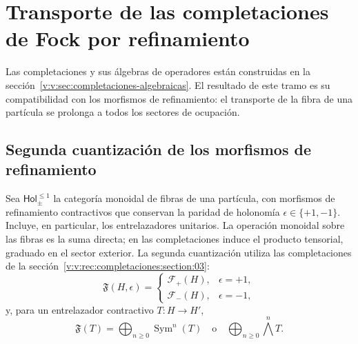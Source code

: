 \section{Transporte de las completaciones de Fock por refinamiento}
\label{v:v:rec:fock_gibbs:section:01}

Las completaciones y sus álgebras de operadores están construidas en la
sección~\ref{v:v:sec:completaciones-algebraicas}. El resultado de este tramo
es su compatibilidad con los morfismos de refinamiento: el transporte de
la fibra de una partícula se prolonga a todos los sectores de ocupación.

\subsection{Segunda cuantización de los morfismos de refinamiento}
\label{v:v:rec:fock_gibbs:section:02}

Sea \(\mathsf{Hol}_{\pm}^{\leq1}\) la categoría monoidal de fibras de una
partícula, con morfismos de refinamiento contractivos que conservan la
paridad de holonomía \(\epsilon\in\{+1,-1\}\). Incluye, en particular,
los entrelazadores unitarios. La operación monoidal sobre las fibras es
la suma directa; en las completaciones induce el producto tensorial,
graduado en el sector exterior. La segunda cuantización utiliza las
completaciones de la sección~\ref{v:v:rec:completaciones:section:03}:
\[
 \mathfrak F(H,\epsilon)=
 \begin{cases}
 \mathcal F_+(H),
     &\epsilon=+1,\\[2mm]
 \mathcal F_-(H),
     &\epsilon=-1,
 \end{cases}
\]
y, para un entrelazador contractivo \(T:H\to H'\),
\[
 \mathfrak F(T)=
 \bigoplus_{n\ge0}\operatorname{Sym}^n(T)
 \quad\text{o}\quad
 \bigoplus_{n\ge0}\bigwedge^n\!T.
\]

